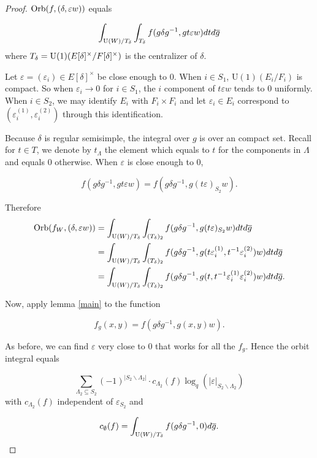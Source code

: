\documentclass[11pt, oneside,reqno]{amsart}   	%
\begin{document}
\begin{proof}
$\textup{Orb}(f,(\delta, \varepsilon w))$ equals

$$\int_{\textup{U}(W)/T_\delta} \int_{T_\delta}f(g\delta g^{-1},gt\varepsilon w)dtd\overline{g}$$
where $T_\delta= \textup{U}(1)(E[\delta]^\times/F[\delta]^\times)$ is the centralizer of $\delta$. 

Let $\varepsilon=(\varepsilon_i) \in E[\delta]^\times$ be close enough to $0$. When $i \in S_1$, U$(1)(E_i/F_i)$ is compact. So when $\varepsilon_i \rightarrow 0$ for $i \in S_1$, the $i$ component of $t\varepsilon w$ tends to $0$ uniformly. When $i \in S_2$,  we may identify $E_i$ with $F_i \times F_i$ and let $\varepsilon_i \in E_i$ correspond to $(\varepsilon_i^{(1)},\varepsilon_i^{(2)})$ through this identification. 

Because $\delta$ is regular semisimple, the integral over $g$ is over an compact set. Recall for $t \in T$, we denote by $t_\Lambda$ the element which equals to $t$ for the components in $\Lambda$ and equals $0$ otherwise. When $\varepsilon$ is close enough to $0$,

$$f(g\delta g^{-1},gt\varepsilon w)=f(g\delta g^{-1},g(t\varepsilon)_{S_2} w).$$ 

Therefore
\begin{align*}
\textup{Orb}(f_W,(\delta, \varepsilon w))
  &   =\int_{\textup{U}(W)/T_\delta} \int_{(T_\delta)_2}f(g\delta g^{-1},g(t\varepsilon)_{S_2} w)dtd\overline{g} \\
 & =\int_{\textup{U}(W)/T_\delta} \int_{(T_\delta)_2}f(g\delta g^{-1},g(t\varepsilon_i^{(1)},t^{-1}\varepsilon_i^{(2)}) w)dtd\overline{g} \\
 &=\int_{\textup{U}(W)/T_\delta} \int_{(T_\delta)_2}f(g\delta g^{-1},g(t,t^{-1}\varepsilon_i^{(1)}\varepsilon_i^{(2)}) w)dtd\overline{g}.
\end{align*}

Now, apply lemma \ref{main} to the function 

$$f_g(x,y)=f(g\delta g^{-1},g(x,y)w).$$

As before, we can find $\varepsilon$ very close to $0$ that works for all the $f_g$. Hence the orbit integral equals

$$\sum_{\Lambda_2 \subseteq S_2}(-1)^{|S_2 \backslash \Lambda_2|} \cdot c_{\Lambda_2}(f) \log_q(|{\varepsilon}|_{S_2 \backslash \Lambda_2})$$
with $c_{\Lambda_2}(f)$ independent of $\varepsilon_{S_2}$ and

 $$c_{\emptyset}(f)=\int_{\textup{U}(W)/T_\delta}f(g\delta g^{-1},0)d\overline{g}.$$

\end{proof}
\end{document}
